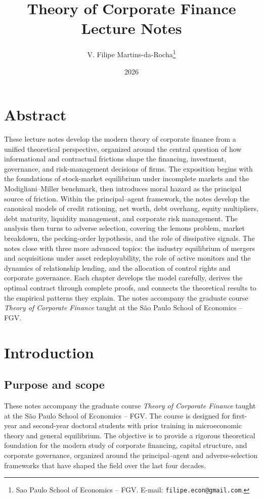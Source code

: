 \documentclass[11pt,a4paper,oneside]{book}
\title{Theory of Corporate Finance \\[4pt]
       \large Lecture Notes}
\author{V. Filipe Martins-da-Rocha\thanks{Sao Paulo School of Economics -- FGV. E-mail: \texttt{filipe.econ@gmail.com}.}}
\date{2026}
\theoremstyle{plain}
\theoremstyle{definition}
\theoremstyle{remark}
\numberwithin{equation}{chapter}
\begin{document}

\frontmatter
\maketitle

\chapter*{Abstract}

These lecture notes develop the modern theory of corporate finance from a unified theoretical perspective, organized around the central question of how informational and contractual frictions shape the financing, investment, governance, and risk-management decisions of firms.
The exposition begins with the foundations of stock-market equilibrium under incomplete markets and the Modigliani--Miller benchmark, then introduces moral hazard as the principal source of friction.
Within the principal--agent framework, the notes develop the canonical models of credit rationing, net worth, debt overhang, equity multipliers, debt maturity, liquidity management, and corporate risk management.
The analysis then turns to adverse selection, covering the lemons problem, market breakdown, the pecking-order hypothesis, and the role of dissipative signals.
The notes close with three more advanced topics: the industry equilibrium of mergers and acquisitions under asset redeployability, the role of active monitors and the dynamics of relationship lending, and the allocation of control rights and corporate governance.
Each chapter develops the model carefully, derives the optimal contract through complete proofs, and connects the theoretical results to the empirical patterns they explain.
The notes accompany the graduate course \emph{Theory of Corporate Finance} taught at the S\~ao Paulo School of Economics -- FGV.

\chapter*{Introduction}

\section*{Purpose and scope}

These notes accompany the graduate course \emph{Theory of Corporate Finance} taught at the S\~ao Paulo School of Economics -- FGV.
The course is designed for first-year and second-year doctoral students with prior training in microeconomic theory and general equilibrium.
The objective is to provide a rigorous theoretical foundation for the modern study of corporate financing, capital structure, and corporate governance, organized around the principal--agent and adverse-selection frameworks that have shaped the field over the last four decades.
\end{document}
